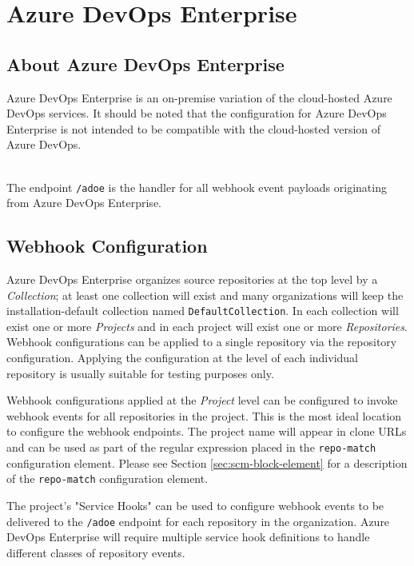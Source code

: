 \chapter{Azure DevOps Enterprise}


\section{About Azure DevOps Enterprise}

Azure DevOps Enterprise is an on-premise variation of the cloud-hosted Azure DevOps services.  It
should be noted that the configuration for Azure DevOps Enterprise is not intended to be
compatible with the cloud-hosted version of Azure DevOps.

\noindent\\The \cxoneflow endpoint \texttt{/adoe} is the handler for all webhook event
payloads originating from Azure DevOps Enterprise.  


\section{Webhook Configuration}

Azure DevOps Enterprise organizes source repositories at the top level by a \textit{Collection};
at least one collection will exist and many organizations will keep the installation-default
collection named \texttt{DefaultCollection}.  In each collection will exist one or more
\textit{Projects} and in each project will exist one or more \textit{Repositories}.  
Webhook configurations can be applied to a single repository via the repository configuration.
Applying the configuration at the level of each individual repository is usually suitable
for testing purposes only.

Webhook configurations applied at the \textit{Project} level can be configured to invoke webhook
events for all repositories in the project.  This is the most ideal location to configure
the webhook endpoints.  The project name will appear in clone URLs and can be used as part of 
the regular expression placed in the \texttt{repo-match} configuration element.  Please see 
Section \ref{sec:scm-block-element} for a description of the \texttt{repo-match} configuration
element.

The project's "Service Hooks" can be used to configure webhook events to be delivered to the
\cxoneflow \texttt{/adoe} endpoint for each repository in the organization.  Azure DevOps
Enterprise will require multiple service hook definitions to handle different classes
of repository events.

